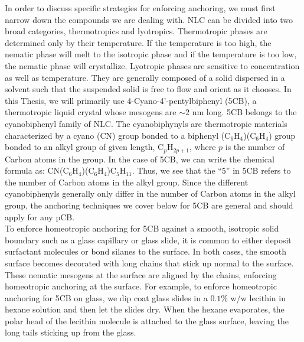 In order to discuss specific strategies for enforcing anchoring, we must first narrow down the compounds we are dealing with.
NLC can be divided into two broad categories, thermotropics and lyotropics.
Thermotropic phases are determined only by their temperature.
If the temperature is too high, the nematic phase will melt to the isotropic phase and if the temperature is too low, the nematic phase will crystallize.
Lyotropic phases are sensitive to concentration as well as temperature.
They are generally composed of a solid dispersed in a solvent such that the suspended solid is free to flow and orient as it chooses.
In this Thesis, we will primarily use 4-Cyano-4'-pentylbiphenyl (5CB), a thermotropic liquid crystal whose mesogens are $\sim 2$ nm long.\@
5CB belongs to the cyanobiphenyl family of NLC.
The cyanobiphynyls are thermotropic materials characterized by a cyano (CN) group  bonded to a biphenyl (C$_6$H$_4$)(C$_6$H$_4$) group bonded to an alkyl group of given length, C$_p$H$_{2p+1}$, where $p$ is the number of Carbon atoms in the group.
In the case of 5CB, we can write the chemical formula as: CN(C$_6$H$_4$)(C$_6$H$_4$)C$_5$H$_{11}$.
Thus, we see that the ``5'' in 5CB refers to the number of Carbon atoms in the alkyl group.
Since the different cyanobiphenyls generally only differ in the number of Carbon atoms in the alkyl group, the anchoring techniques we cover below for 5CB are general and should apply for any pCB. \\

To enforce homeotropic anchoring for 5CB against a smooth, isotropic solid boundary such as a glass capillary or glass slide, it is common to either deposit surfactant molecules or bond silanes to the surface.
In both cases, the smooth surface becomes decorated with long chains that stick up normal to the surface.
These nematic mesogens at the surface are aligned by the chains, enforcing homeotropic anchoring at the surface.
For example, to enforce homeotropic anchoring for 5CB on glass, we dip coat glass slides in a $0.1$\% w/w lecithin in hexane solution and then let the slides dry.
When the hexane evaporates, the polar head of the lecithin molecule is attached to the glass surface, leaving the long tails sticking up from the glass.\\

